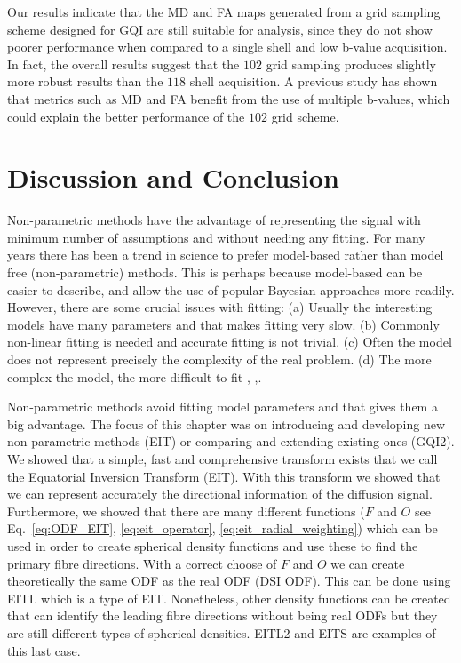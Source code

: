 \documentclass{bioinfo}
\begin{document}
Our results indicate that the MD and FA maps generated from a grid
sampling scheme designed for GQI are still suitable for analysis,
since they do not show poorer performance when compared to a single
shell and low b-value acquisition. In fact, the overall results suggest
that the $102$ grid sampling produces slightly more robust results
than the $118$ shell acquisition. A previous study \cite{correia2009looking}
has shown that metrics such as MD and FA benefit from the use of multiple
b-values, which could explain the better performance of the $102$
grid scheme.

\section{Discussion and Conclusion}

Non-parametric methods have the advantage of representing the signal
with minimum number of assumptions and without needing any fitting.
For many years there has been a trend in science to prefer model-based
rather than model free (non-parametric) methods. This is perhaps because
model-based can be easier to describe, and allow the use of popular
Bayesian approaches more readily. However, there are some crucial
issues with fitting: (a) Usually the interesting models have many
parameters and that makes fitting very slow. (b) Commonly non-linear
fitting is needed and accurate fitting is not trivial. (c) Often the
model does not represent precisely the complexity of the real problem.
(d) The more complex the model, the more difficult to fit \cite{rice2006mathematical},
\cite{lee1997bayesian},\cite{montgomery2001introduction}. 

Non-parametric methods avoid fitting model parameters and that gives
them a big advantage. The focus of this chapter was on introducing
and developing new non-parametric methods (EIT) or comparing and extending
existing ones (GQI2). We showed that a simple, fast and comprehensive
transform exists that we call the Equatorial Inversion Transform (EIT).
With this transform we showed that we can represent accurately the
directional information of the diffusion signal. Furthermore, we showed
that there are many different functions ($F$ and $O$ see Eq.~\ref{eq:ODF_EIT},
\ref{eq:eit_operator}, \ref{eq:eit_radial_weighting}) which can
be used in order to create spherical density functions and use these
to find the primary fibre directions. With a correct choose of $F$
and $O$ we can create theoretically the same ODF as the real ODF
(DSI ODF). This can be done using EITL which is a type of EIT. Nonetheless,
other density functions can be created that can identify the leading
fibre directions without being real ODFs but they are still different
types of spherical densities. EITL2 and EITS are examples of this
last case. 
\end{document}
